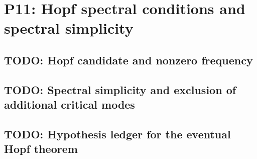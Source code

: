 
\section{P11: Hopf spectral conditions and spectral simplicity}
\label{sec:P11}

\subsection{TODO: Hopf candidate and nonzero frequency}
\label{slot:P11-1}

\subsection{TODO: Spectral simplicity and exclusion of additional critical modes}
\label{slot:P11-2}

\subsection{TODO: Hypothesis ledger for the eventual Hopf theorem}
\label{slot:P11-3}
